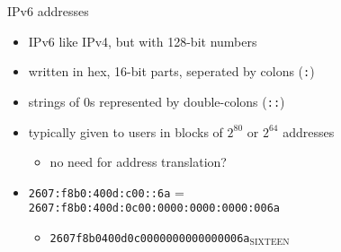 \begin{frame}{IPv6 addresses}
    \begin{itemize}
    \item IPv6 like IPv4, but with 128-bit numbers
    \item written in hex, 16-bit parts, seperated by colons (\texttt{:})
    \item strings of 0s represented by double-colons (\texttt{::})
    \item typically given to users in blocks of $2^{80}$ or $2^{64}$ addresses
        \begin{itemize}
        \item no need for address translation?
        \end{itemize}
    \vspace{.5cm}
    \item \fontsize{10}{11}\selectfont\texttt{2607:f8b0:400d:c00::6a} = \\
          \texttt{2607:f8b0:400d:0c00:0000:0000:0000:006a}
          \begin{itemize}
          \item \texttt{2607f8b0400d0c0000000000000006a}$_\text{SIXTEEN}$
          \end{itemize}
    \end{itemize}
\end{frame}


